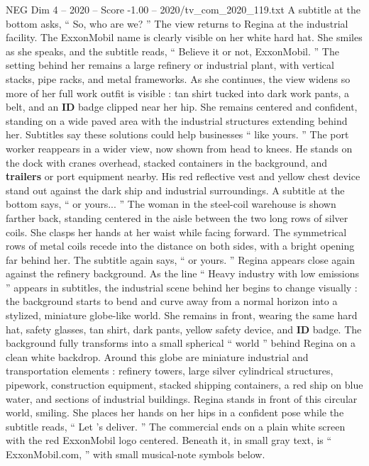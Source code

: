 \begin{textsample}{NEG Dim 4 – 2020 – Score -1.00 – 2020/tv\_com\_2020\_119.txt}
A subtitle at the bottom asks, “ So, who are we? ” The view returns to Regina at the industrial facility.
The ExxonMobil name is clearly visible on her white hard hat.
She smiles as she speaks, and the subtitle reads, “ Believe it or not, ExxonMobil. ” The setting behind her remains a large refinery or industrial plant, with vertical stacks, pipe racks, and metal frameworks.
As she continues, the view widens so more of her full work outfit is visible : tan shirt tucked into dark work pants, a belt, and an \textbf{ID} badge clipped near her hip.
She remains centered and confident, standing on a wide paved area with the industrial structures extending behind her.
Subtitles say these solutions could help businesses “ like yours. ” The port worker reappears in a wider view, now shown from head to knees.
He stands on the dock with cranes overhead, stacked containers in the background, and \textbf{trailers} or port equipment nearby.
His red reflective vest and yellow chest device stand out against the dark ship and industrial surroundings.
A subtitle at the bottom says, “ or yours... ” The woman in the steel-coil warehouse is shown farther back, standing centered in the aisle between the two long rows of silver coils.
She clasps her hands at her waist while facing forward.
The symmetrical rows of metal coils recede into the distance on both sides, with a bright opening far behind her.
The subtitle again says, “ or yours. ” Regina appears close again against the refinery background.
As the line “ Heavy industry with low emissions ” appears in subtitles, the industrial scene behind her begins to change visually : the background starts to bend and curve away from a normal horizon into a stylized, miniature globe-like world.
She remains in front, wearing the same hard hat, safety glasses, tan shirt, dark pants, yellow safety device, and \textbf{ID} badge.
The background fully transforms into a small spherical “ world ” behind Regina on a clean white backdrop.
Around this globe are miniature industrial and transportation elements : refinery towers, large silver cylindrical structures, pipework, construction equipment, stacked shipping containers, a red ship on blue water, and sections of industrial buildings.
Regina stands in front of this circular world, smiling.
She places her hands on her hips in a confident pose while the subtitle reads, “ Let ’s deliver. ” The commercial ends on a plain white screen with the red ExxonMobil logo centered.
Beneath it, in small gray text, is “ ExxonMobil.com, ” with small musical-note symbols below.

\end{textsample}
